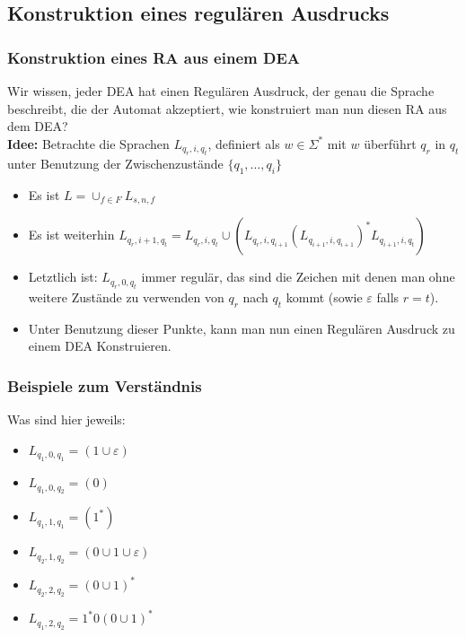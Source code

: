 \documentclass{beamer}
\begin{document}
{\subsection{Konstruktion eines regulären Ausdrucks}
\begin{frame}
\frametitle{Konstruktion eines RA aus einem DEA}
Wir wissen, jeder DEA hat einen Regulären Ausdruck, der genau die Sprache beschreibt, die der Automat akzeptiert, wie konstruiert man nun diesen RA aus dem DEA?\\[0.6cm]
\textbf{Idee:} Betrachte die Sprachen $L_{q_r,i,q_t}$, definiert als \( w \in \Sigma^*\) mit $w$ überführt $q_r$ in $q_t$ unter Benutzung der Zwischenzustände $\{q_1,\ldots,q_i\}$
\begin{itemize}
\item Es ist $L = \cup_{f\in F} L_{s,n,f}$
\item Es ist weiterhin $L_{q_r,i+1,q_t} = L_{q_r,i,q_t} \cup (L_{q_r,i,q_{i+1}}(L_{q_{i+1},i,q_{i+1}})^*L_{q_{i+1},i,q_t})$
\item Letztlich ist: $L_{q_r, 0, q_t}$ immer regulär, das sind die Zeichen mit denen man ohne weitere Zustände zu verwenden von $q_r$ nach $q_t$ kommt (sowie $\varepsilon$ falls $r = t$).
\item Unter Benutzung dieser Punkte, kann man nun einen Regulären Ausdruck zu einem DEA Konstruieren.
\end{itemize}
\end{frame}
\begin{frame}
\frametitle{Beispiele zum Verständnis}
\vspace{-1cm}
\begin{figure}[H]
\begin{center}
\end{center}
\end{figure}
Was sind hier jeweils:
\begin{itemize}
\item $L_{q_1,0,q_1}$\pause $ = (1\cup\varepsilon)$
\item $L_{q_1,0,q_2}$\pause $ = (0)$
\item $L_{q_1,1,q_1}$\pause $ = (1^*)$
\item $L_{q_2,1,q_2}$\pause $ = (0\cup1\cup\varepsilon)$
\item $L_{q_2,2,q_2}$\pause $ = (0\cup1)^*$
\item $L_{q_1,2,q_2}$\pause $ = 1^*0(0\cup1)^*$
\end{itemize}
\end{frame}

}
\end{document}
